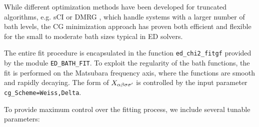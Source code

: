 \documentclass[edipack_sp.tex]{subfiles}
\begin{document}
While different optimization methods have been developed for 
truncated algorithms, e.g. sCI \cite{Mejuto-Zaera2020PRB} or DMRG \cite{Bauernfeind2017PRX}, 
which handle systems with a 
larger number of bath levels, the CG minimization approach has proven 
both efficient and flexible for the small to moderate bath sizes 
typical in ED solvers. 

The entire fit procedure is encapsulated in the function 
\texttt{ed\_chi2\_fitgf} provided by the module 
\texttt{ED\_BATH\_FIT}. To exploit the regularity of the bath functions, 
the fit is performed on the Matsubara frequency axis, where the functions 
are smooth and rapidly decaying. The form of $X_{\alpha\beta\sigma\sigma'}$ is controlled 
by the input parameter \texttt{cg\_Scheme=Weiss,Delta}.

To provide maximum control over the fitting process, we include several 
tunable parameters:
\end{document}
